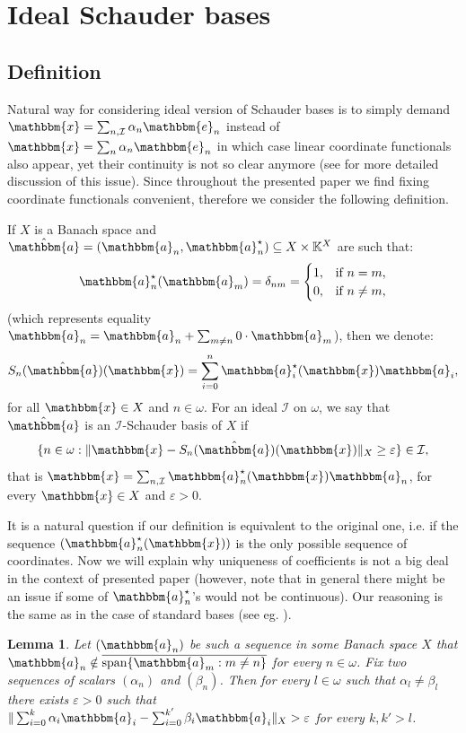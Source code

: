 \documentclass{amsart}
\newcommand{\on}{\operatorname}
\newcommand{\IK}{\mathbb{K}}
\newcommand{\I}{\mathcal{I}}
\newcommand{\w}{\mathbbm}
\newtheorem{lemma}[theorem]{Lemma}
\begin{document}
\section{Ideal Schauder bases}

\subsection{Definition}

Natural way for considering ideal version of Schauder bases is to simply demand $\w{x}=\sum_{n,\I} \alpha_n \w{e}_n$ instead of $\w{x}=\sum_{n} \alpha_n \w{e}_n$ in which case linear coordinate functionals also appear, yet their continuity is not so clear anymore (see \cite{CGK,RKS,KS,Kochanek}  for more detailed discussion of this issue). Since throughout the presented paper we find fixing coordinate functionals convenient, therefore we consider the following definition.

If $X$ is a Banach space and $\hat{\w{a}}=(\w{a}_n,\w{a}^\star_n)\subseteq X\times \IK^X$ are such that: 
\[
\w{a}^\star_n(\w{a}_m)=\delta_{nm}=\begin{cases}
    1, & \text{if }n=m,\\
    0, & \text{if }n\neq m,
\end{cases}
\]
(which represents equality $\w{a}_n=\w{a}_n +\sum_{m\neq n}0\cdot \w{a}_m$), then we denote: 
\[
S_n(\hat{\w{a}})(\w{x})=\sum_{i=0}^n \w{a}_i^\star(\w{x}) \w{a}_i,
\]
for all $\w{x}\in X$ and $n\in\omega$. For an ideal $\I$ on $\omega$, we say that $\hat{\w{a}}$ is an $\I$-Schauder basis of $X$ if
\[
\{n\in\omega: \|\w{x}-S_n(\hat{\w{a}})(\w{x})\|_X\geq\varepsilon\}\in\I,
\]
that is $\w{x}=\sum_{n,\I} \w{a}^\star_n(\w{x})\w{a}_n$, for every $\w{x}\in X$ and $\varepsilon>0$.

It is a natural question if our definition is equivalent to the original one, i.e. if the sequence $(\w{a}_n^\star (\w{x}))$ is the only possible sequence of coordinates. Now we will explain why uniqueness of coefficients is not a big deal in the context of presented paper (however, note that in general there might be an issue if some of $\w{a}_n^\star$'s would not be continuous). Our reasoning is the same as in the case of standard bases (see eg. \cite[Definition 1.1.2, Theorem 1.1.3]{AK}).

\begin{lemma}
\label{L:wspolczynniki}
Let $(\w{a}_n)$ be such a sequence in some Banach space $X$ that $\w{a}_n\notin \overline{\on{span}\{\w{a}_m:m \neq n\}}$ for every $n \in \omega$. Fix two sequences of scalars $(\alpha_n)$ and $(\beta_n)$. Then for every $l\in \omega$ such that $\alpha_l\neq \beta_l$ there exists $\varepsilon>0$ such that $\|\sum_{i=0}^k \alpha_i\w{a}_i - \sum_{i=0}^{k'} \beta_i\w{a}_i\|_X>\varepsilon$ for every $k,k'>l$.
\end{lemma}
\end{document}

